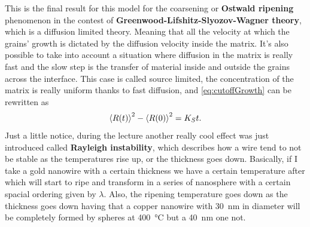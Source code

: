 \noindent
This is the final result for this model for the coarsening or \textbf{Ostwald ripening} phenomenon in the contest of \textbf{Greenwood-Lifshitz-Slyozov-Wagner theory}, which is a diffusion limited theory. Meaning that all the velocity at which the grains' growth is dictated by the diffusion velocity inside the matrix. It's also possible to take into account a situation where diffusion in the matrix is really fast and the slow step is the transfer of material inside and outside the grains across the interface. This case is called source limited, the concentration of the matrix is really uniform thanks to fast diffusion, and \eqref{eq:cutoffGrowth} can be rewritten as
\begin{equation}
    \left\langle R(t) \right\rangle^2 - \left\langle R(0) \right\rangle^2 = K_St.
\end{equation}
\nt
{
    Just a little notice, during the lecture another really cool effect was just introduced called \textbf{Rayleigh instability}, which describes how a wire tend to not be stable as the temperatures rise up, or the thickness goes down. Basically, if I take a gold nanowire with a certain thickness we have a certain temperature after which will start to ripe and transform in a series of nanosphere with a certain spacial ordering given by $\lambda$. Also, the ripening temperature goes down as the thickness goes down having that a copper nanowire with \SI{30}{\nano\metre} in diameter will be completely formed by spheres at \SI{400}{\degreeCelsius} but a \SI{40}{\nano\metre} one not.
}